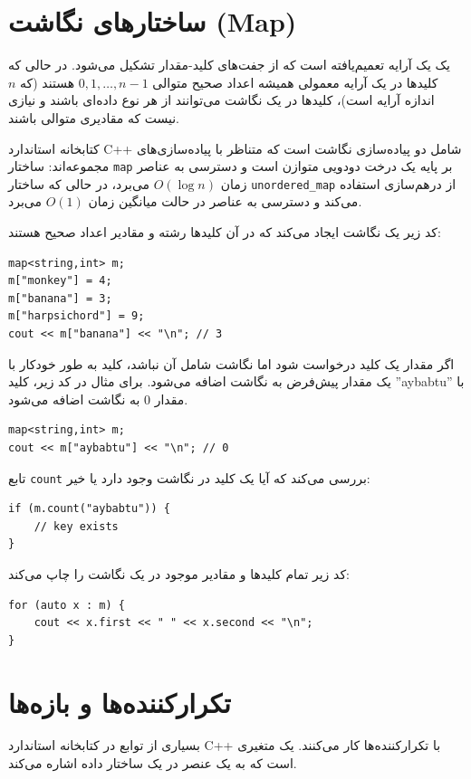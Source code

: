\section{ساختارهای نگاشت (Map)}


یک  یک آرایه تعمیم‌یافته است
که از جفت‌های کلید-مقدار تشکیل می‌شود.
در حالی که کلیدها در یک آرایه معمولی همیشه
اعداد صحیح متوالی $0,1,\ldots,n-1$ هستند
(که $n$ اندازه آرایه است)،
کلیدها در یک نگاشت می‌توانند از هر نوع داده‌ای باشند و
نیازی نیست که مقادیری متوالی باشند.

کتابخانه استاندارد C++ شامل دو پیاده‌سازی نگاشت است
که متناظر با پیاده‌سازی‌های مجموعه‌اند: ساختار
\texttt{map} بر پایه یک درخت دودویی متوازن
است و دسترسی به عناصر
زمان $O(\log n)$ می‌برد،
در حالی که ساختار
\texttt{unordered\_map} از درهم‌سازی استفاده می‌کند
و دسترسی به عناصر در حالت میانگین زمان $O(1)$ می‌برد.

کد زیر یک نگاشت ایجاد می‌کند
که در آن کلیدها رشته و مقادیر اعداد صحیح هستند:

\begin{lstlisting}
map<string,int> m;
m["monkey"] = 4;
m["banana"] = 3;
m["harpsichord"] = 9;
cout << m["banana"] << "\n"; // 3
\end{lstlisting}

اگر مقدار یک کلید درخواست شود
اما نگاشت شامل آن نباشد،
کلید به طور خودکار با یک مقدار پیش‌فرض
به نگاشت اضافه می‌شود.
برای مثال در کد زیر،
کلید ''aybabtu'' با مقدار 0
به نگاشت اضافه می‌شود.

\begin{lstlisting}
map<string,int> m;
cout << m["aybabtu"] << "\n"; // 0
\end{lstlisting}
تابع \texttt{count} بررسی می‌کند
که آیا یک کلید در نگاشت وجود دارد یا خیر:
\begin{lstlisting}
if (m.count("aybabtu")) {
    // key exists
}
\end{lstlisting}
کد زیر تمام کلیدها و مقادیر
موجود در یک نگاشت را چاپ می‌کند:
\begin{lstlisting}
for (auto x : m) {
    cout << x.first << " " << x.second << "\n";
}
\end{lstlisting}

\section{تکرارکننده‌ها و بازه‌ها}


بسیاری از توابع در کتابخانه استاندارد C++
با تکرارکننده‌ها کار می‌کنند.
یک  متغیری است که به یک عنصر
در یک ساختار داده اشاره می‌کند.

